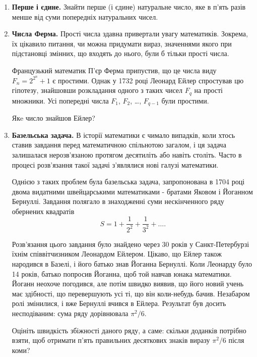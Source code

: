 \begin{enumerate}
\item \textbf{Перше і єдине.} Знайти перше (і єдине) натуральне число, яке в п'ять разів менше від суми попередніх  натуральних чисел.
\item \textbf{Числа Ферма.} Прості числа здавна привертали увагу математиків. Зокрема, їх цікавило питання, чи можна придумати вираз, значеннями якого при підстановці змінних, що входять до нього, були б тільки прості числа.

Французький математик П'єр Ферма припустив, що це числа виду $F_n = 2^{2^n}+1$ є простими. Однак у 1732 році Леонард Ейлер спростував цю гіпотезу, знайшовши розкладання одного з таких чисел $ F_q $ на прості множники. Усі попередні числа $F_1$, $F_2$, \ldots, $F_{q-1}$ були простими.

Якe число знайшов Ейлер?
\item \textbf{Базельська задача.} В історії математики є чимало випадків, коли хтось ставив завдання перед математичною спільнотою загалом, і ця задача залишалася нерозв'язаною протягом десятиліть або навіть століть. Часто в процесі розв'язання такої задачі з'являлися нові галузі математики.

Однією з таких проблем була базельська задача, запропонована в 1704 році двома видатними швейцарськими математиками - братами Яковом і Йоганном Бернуллі. Завдання полягало в знаходженні суми нескінченного ряду обернених квадратів
$$
S=1+\frac{1}{2^2}+\frac{1}{3^2}+\ldots.
$$

Розв'язання цього завдання було знайдено через 30 років у Санкт-Петербурзі їхнім співвітчизником Леонардом Ейлером. Цікаво, що Ейлер також народився в Базелі, і його батько знав Йоганна Бернуллі. Коли Леонарду було 14 років, батько попросив Йоганна, щоб той навчав юнака математики. Йоганн неохоче погодився, але потім швидко виявив, що його новий учень має здібності, що перевершують усі ті, що він коли-небудь бачив. Незабаром ролі змінилися, і вже Бернуллі вчився в Ейлера. Результат був досить несподіваним: сума ряду дорівнювала $\pi^2/6 $.

Оцініть швидкість збіжності даного ряду, а саме: скільки доданків потрібно взяти, щоб отримати п'ять правильних десяткових знаків виразу $\pi^2/6$ після коми?
\end{enumerate}




